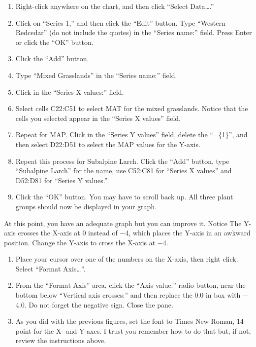 \documentclass[12pt, hidelinks]{exam}
\begin{document}
\begin{enumerate}[resume]
	\item Right-click anywhere on the chart, and then click “Select Data….”

	\item Click on “Series 1,” and then click the “Edit” button. Type “Western Redcedar” (do not include the quotes) in the “Series name:” field. Press Enter or click the “OK” button.

	\item Click the “Add” button.

	\item Type “Mixed Grasslands” in the “Series name:” field.

	\item Click in the “Series X values:” field.

	\item Select cells C22:C51 to select MAT for the mixed grasslands. Notice that the cells you selected appear in the “Series X values” field.

	\item Repeat for MAP. Click in the “Series Y values” field, delete the “=\{1\}”, and then select D22:D51 to select the MAP values for the Y-axis. 

	\item Repeat this process for Subalpine Larch. Click the “Add” button, type “Subalpine Larch” for the name, use C52:C81 for “Series X values” and D52:D81 for “Series Y values.” 

	\item Click the “OK” button. You may have to scroll back up. All three plant groups should now be displayed in your graph. 
\end{enumerate}

At this point, you have an adequate graph but you can improve it. Notice The Y-axis crosses the X-axis at 0 instead of $-$4, which places the Y-axis in an awkward position. Change the Y-axis to cross the X-axis at $-$4.

\begin{enumerate}[resume]
	\item Place your cursor over one of the numbers on the X-axis, then right click. Select “Format Axis…”.

	\item From the “Format Axis” area, click the “Axis value:” radio button, near the bottom below “Vertical axis crosses:” and then replace the 0.0 in box with $-$4.0. Do not forget the negative sign. Close the pane.

	\item As you did with the previous figures, set the font to Times New Roman, 14 point for the X- and Y-axes. I trust you remember how to do that but, if not, review the instructions above.
\end{enumerate}
\end{document}
